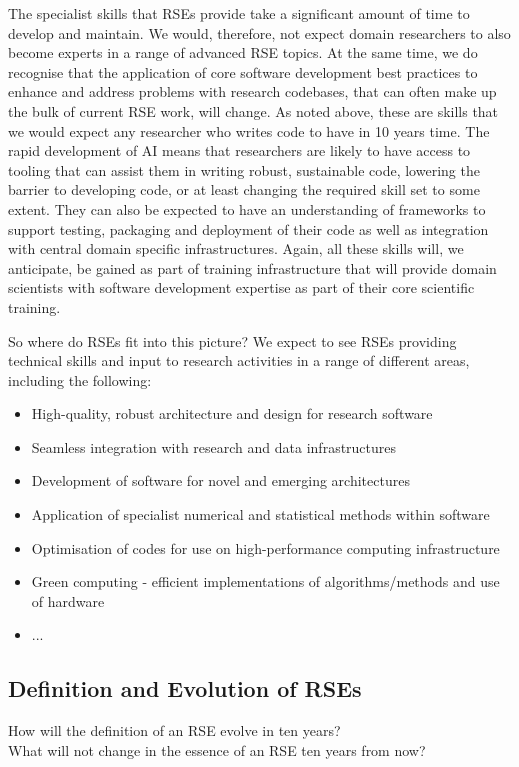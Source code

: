 \documentclass{eceasst}
\begin{document}
The specialist skills that RSEs provide take a significant amount of time to develop and maintain.
We would, therefore, not expect domain researchers to also become experts in a range of
advanced RSE topics. 
At the same time, we do recognise that the application of core software development best practices
to enhance and address problems with research codebases, that can often make up the bulk of
current RSE work, will change. As noted above, these are skills that we
would expect any researcher who writes code to have in 10 years time. 
The rapid development of AI means that researchers are likely to have access to tooling that can assist
them in writing robust, sustainable code, lowering the barrier to developing code, or at least changing the
required skill set to some extent.
They can also be expected to have an understanding of frameworks to support testing, packaging and
deployment of their code as well as integration with central domain specific infrastructures.
Again, all these skills will, we anticipate, be gained as part of training infrastructure that will
provide domain scientists with software development expertise as part of their core scientific training.

So where do RSEs fit into this picture? We expect to see RSEs providing technical skills and input
to research activities in a range of different areas, including the following:
\begin{itemize}
  \item High-quality, robust architecture and design for research software
  \item Seamless integration with research and data infrastructures
  \item Development of software for novel and emerging architectures
  \item Application of specialist numerical and statistical methods within software
  \item Optimisation of codes for use on high-performance computing infrastructure
  \item Green computing - efficient implementations of algorithms/methods and use of hardware
  \item ...
\end{itemize}

\subsection{Definition and Evolution of RSEs}
\begin{framed}
\hfill How will the definition of an RSE evolve in ten years?\\

\hfill What will not change in the essence of an RSE ten years from now?
\end{framed}
\end{document}
